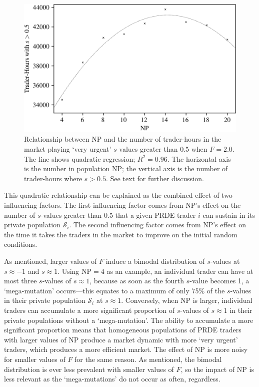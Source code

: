 \documentclass[conference]{IEEEtran}
\begin{document}
\begin{figure}[htbp]
    \centerline{\includegraphics[width=\columnwidth]{f=2.0_strats.png}}
    \caption{
        Relationship between $\mathrm{NP}$ and the number of trader-hours in the market playing `very urgent' $s$ values greater than 0.5 when $F=2.0$.
        The line shows quadratic regression; $R^2=0.96$.
        The horizontal axis is the number in population $\mathrm{NP}$; the vertical axis is the number of trader-hours where $s>0.5$.
        See text for further discussion.
    }
    \label{F=2.0_strats}
\end{figure}

This quadratic relationship can be explained as the combined effect of two influencing factors.
The first influencing factor comes from $\mathrm{NP}$'s effect on the number of $s$-values greater than 0.5 that a given PRDE trader $i$ can sustain in its private population $\mathcal{S}_i$.
The second influencing factor comes from $\mathrm{NP}$'s effect on the time it takes the traders in the market to improve on the initial random conditions.

As mentioned, larger values of $F$ induce a bimodal distribution of $s$-values at $s\approx -1$ and $s\approx 1$.
Using $\mathrm{NP}=\mathrm{4}$ as an example, an individual trader can have at most three $s$-values of $s\approx 1$, because as soon as the fourth $s$-value becomes 1, a `mega-mutation' occurs---this equates to a maximum of only 75\% of the $s$-values in their private population $\mathcal{S}_i$ at $s\approx 1$.
Conversely, when $\mathrm{NP}$ is larger, individual traders can accumulate a more significant proportion of $s$-values of $s\approx 1$ in their private populations without a `mega-mutation'.
The ability to accumulate a more significant proportion means that homogeneous populations of PRDE traders with larger values of $\mathrm{NP}$ produce a market dynamic with more `very urgent' traders, which produces a more efficient market.
The effect of $\mathrm{NP}$ is more noisy for smaller values of $F$ for the same reason.
As mentioned, the bimodal distribution is ever less prevalent with smaller values of $F$, so the impact of $\mathrm{NP}$ is less relevant as the `mega-mutations' do not occur as often, regardless.
\end{document}
